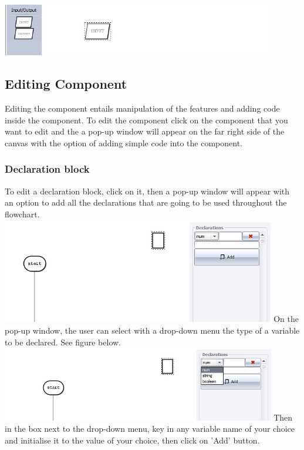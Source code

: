 \documentclass[11pt,a4paper,titlepage]{article}
\begin{document}
	\includegraphics[width=12cm]{images/io.jpg}
	
	\subsection{Editing Component}
	
	Editing the component entails manipulation of the features and adding code inside the component. To edit the component click on the component that you want to edit and the a pop-up window will appear on the far right side of the canvas with the option of adding simple code into the component.
	
	\subsubsection{Declaration block}
	
	To edit a declaration block, click on it, then a pop-up window will appear with an option to add all the declarations that are going to be used throughout the flowchart.\\
	
	\includegraphics[width=12cm]{images/editDeclaration.jpg} \newline \newline
	On the pop-up window, the user can select with a drop-down menu the type of a variable to be declared. See figure below.\\
	
	\includegraphics[width=12cm]{images/editDeclaration1.jpg} \newline \newline
	Then in the box next to the drop-down menu, key in any variable name of your choice and initialise it to the value of your choice, then click on 'Add' button.\\
	
\end{document}
